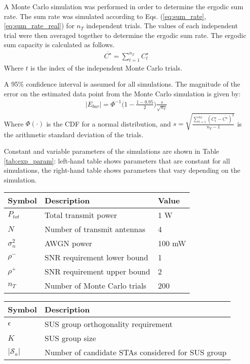 A Monte Carlo simulation was performed in order to determine the ergodic sum rate. The sum rate was simulated according to Eqs. (\ref{eq:sum_rate},\ref{eq:sum_rate_real}) for $n_T$ independent trials. The values of each independent trial were then averaged together to determine the ergodic sum rate. The ergodic sum capacity is calculated as follows.
\begin{equation}\label{eq:erg_sum_rate}
    \begin{aligned}
    \overline{C^\star} = \sum_{t=1}^{n_T} C_t^\star
    \end{aligned}
\end{equation}
Where $t$ is the index of the independent Monte Carlo trials.

A 95\% confidence interval is assumed for all simulations. The magnitude of the error on the estimated data point from the Monte Carlo simulation is given by:
\begin{equation}\label{eq:ebar_mag}
    \begin{aligned}
    \vert E_{bar} \vert = \Phi^{-1}\bigg(1-\frac{1-0.95}{2}\bigg)\frac{s}{\sqrt{n_T}}
    \end{aligned}
\end{equation}
Where $\Phi (\cdot)$ is the CDF for a normal distribution, and  $s = \sqrt{\frac{\sum_{t=1}^{n_T}(C_t^\star-\overline{C^\star})^2}{n_T-1}}$ is the arithmetic standard deviation of the trials. 

Constant and variable parameters of the simulations are shown in Table \ref{tab:exp_param}: left-hand table shows parameters that are constant for all simulations, the right-hand table shows parameters that vary depending on the simulation. 
 \label{tab:exp_param}
\begin{tabular}{ p{1.25cm}  p{4cm}  p{2cm} }\toprule[1.5pt]
\bf Symbol & \bf Description & \bf Value \\\midrule
$P_{tot}$ & Total transmit power & 1 W\\
$N$ & Number of transmit antennas & 4\\
$\sigma_n^2$ & AWGN power & 100 mW\\
$\rho^-$ & SNR requirement lower bound & 1\\
$\rho^+$ & SNR requirement upper bound & 2\\
$n_{T}$ & Number of Monte Carlo trials & 200\\
\bottomrule[1.25pt]
\end{tabular}
\quad
\begin{tabular}{ p{1.25cm}  p{4cm} }\toprule[1.5pt]
\bf Symbol & \bf Description \\\midrule
$\epsilon$ & SUS group orthogonality requirement \\
$K$ & SUS group size \\
$\vert \mathcal{S}_a \vert$ & Number of candidate STAs considered for SUS group \\
\bottomrule[1.25pt]
\end{tabular}
\setlength{\parindent}{2em}
\setlength{\parskip}{.25em}
\renewcommand{\baselinestretch}{1.0}
